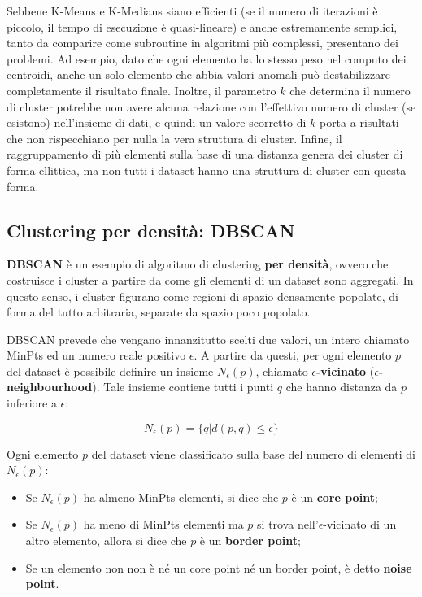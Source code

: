 \documentclass[a4paper, 12pt]{report}
\begin{document}
				Sebbene K-Means e K-Medians siano efficienti (se il numero di
				iterazioni è piccolo, il tempo di esecuzione è quasi-lineare) e
				anche estremamente semplici, tanto da comparire come subroutine
				in algoritmi più complessi, presentano dei problemi. Ad esempio,
				dato che ogni elemento ha lo stesso peso nel computo dei centroidi,
				anche un solo elemento che abbia valori anomali può destabilizzare
				completamente il risultato finale. Inoltre, il parametro $k$ che
				determina il numero di cluster potrebbe non avere alcuna relazione
				con l'effettivo numero di cluster (se esistono) nell'insieme di
				dati, e quindi un valore scorretto di $k$ porta a risultati che
				non rispecchiano per nulla la vera struttura di cluster. Infine,
				il raggruppamento di più elementi sulla base di una distanza genera
				dei cluster di forma ellittica, ma non tutti i dataset hanno una
				struttura di cluster con questa forma.

			\subsection{Clustering per densità: DBSCAN}

				\textbf{DBSCAN} è un esempio di algoritmo di clustering \textbf{per
				densità}, ovvero che costruisce i cluster a partire da come gli
				elementi di un dataset sono aggregati. In questo senso, i cluster
				figurano come regioni di spazio densamente popolate, di forma del
				tutto arbitraria, separate da spazio poco popolato.

				DBSCAN prevede che vengano innanzitutto scelti due valori, un intero
				chiamato MinPts ed un numero reale positivo $\epsilon$. A partire da
				questi, per ogni elemento $p$ del dataset è possibile definire un
				insieme $N_{\epsilon}(p)$, chiamato $\epsilon$\textbf{-vicinato}
				($\epsilon$\textbf{-neighbourhood}). Tale insieme contiene tutti i
				punti $q$ che hanno distanza da $p$ inferiore a $\epsilon$:

				\begin{equation*}
					N_{\epsilon} (p) = \{q | d(p, q) \leq \epsilon\}
				\end{equation*}

				Ogni elemento $p$ del dataset viene classificato sulla base del numero
				di elementi di $N_{\epsilon}(p)$:

				\begin{itemize}
					\item
					Se $N_{\epsilon}(p)$ ha almeno MinPts elementi, si dice che $p$ è un
					\textbf{core point};
					\item
					Se $N_{\epsilon}(p)$ ha meno di MinPts elementi ma $p$ si trova
					nell'$\epsilon$-vicinato di un altro elemento, allora si dice che
					$p$ è un \textbf{border point};
					\item
					Se un elemento non non è né un core point né un border
					point, è detto \textbf{noise point}.
				\end{itemize}
\end{document}
